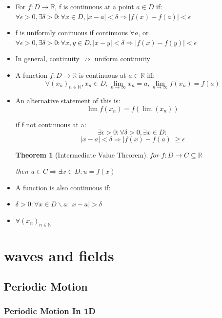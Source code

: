 \documentclass{article}
\newtheorem{theorem}{Theorem}
\begin{document}
\begin{itemize}
    \item For \(f: D\rightarrow\mathbb{R}\), f is continuous at a point \(a\in D\) if:
    \\\(\forall\epsilon>0, \exists\delta>0:\forall x\in D, |x-a|<\delta\Rightarrow|f(x)-f(a)|<\epsilon\)
    \item f is uniformly coninuous if continuous \(\forall a\), or
    \\\(\forall\epsilon>0, \exists\delta>0:\forall x, y\in D, |x-y|<\delta\Rightarrow|f(x)-f(y)|<\epsilon\)
    \item In general, continuity \(\not\Rightarrow\) uniform continuity

    \item A function \(f:D\rightarrow\mathbb{R}\) is continuous at \(a\in\mathbb{R}\) iff:
    \[\forall(x_n)_{n\in\mathbb{N}}, x_n\in D, \lim_{n\to\infty}{x_n} = a, \lim_{n\to\infty}{f(x_n)}=f(a)\]
    \item An alternative statement of this is:
    \[\lim{f(x_n)}=f(\lim(x_n))\]

    if f not continuous at a:
    \[\exists\epsilon>0:\forall\delta>0, \exists x\in D:\]
    \[|x-a|<\delta\Rightarrow|f(x)-f(a)|\ge\epsilon\]
    

\begin{theorem}[Intermediate Value Theorem]

    for \(f:D\rightarrow C\subseteq\mathbb{R}\)

    then \(u\in C\Rightarrow \exists x\in D: u=f(x)\)

\end{theorem} 

    \item A function is also continuous if:
    \item \(\delta >0: \forall x\in D\backslash a: |x-a|>\delta\)
    \item \(\forall (x_n)_{n\in\mathbb{N}}\)
\end{itemize}


\newpage
\section{waves and fields}
\subsection{Periodic Motion}
\subsubsection*{Periodic Motion In 1D}
\end{document}
